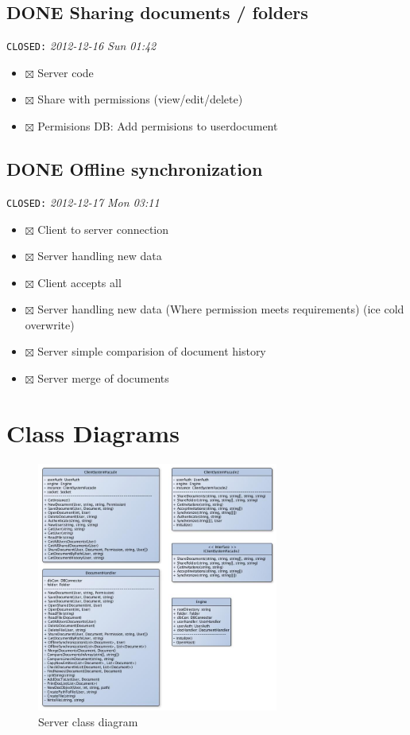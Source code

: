 \documentclass[11pt,a4paper]{article}
\begin{document}
\subsection{\textbf{DONE} Sharing documents / folders}
\label{sec-2-9}

   \texttt{CLOSED:} \textit{2012-12-16 Sun 01:42}

\begin{itemize}
\item $\boxtimes$ Server code
\item $\boxtimes$ Share with permissions (view/edit/delete)
\item $\boxtimes$ Permisions DB: Add permisions to userdocument
\end{itemize}
\subsection{\textbf{DONE} Offline synchronization}
\label{sec-2-10}

   \texttt{CLOSED:} \textit{2012-12-17 Mon 03:11}

\begin{itemize}
\item $\boxtimes$ Client to server connection
\item $\boxtimes$ Server handling new data
\item $\boxtimes$ Client accepts all
\item $\boxtimes$ Server handling new data (Where permission meets requirements) (ice cold overwrite)
\item $\boxtimes$ Server simple comparision of document history
\item $\boxtimes$ Server merge of documents
\end{itemize}

\section{Class Diagrams}
\begin{figure}[H]
  		\centering
    	\includegraphics[width=300px]{images/ServerClassDiagram1of2.jpg}
    	\caption{Server class diagram}
\end{figure}
\end{document}
